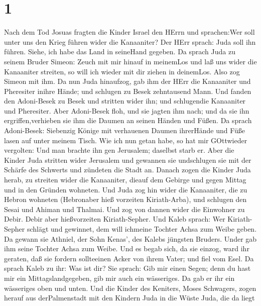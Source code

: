 \hypertarget{section}{%
\section{1}\label{section}}

 Nach dem Tod Josuas fragten die Kinder Israel den HErrn und
sprachen:Wer soll unter uns den Krieg führen wider die Kanaaniter?
 Der HErr sprach: Juda soll ihn führen. Siehe, ich habe das
Land in seineHand gegeben.  Da sprach Juda zu seinem Bruder
Simeon: Zeuch mit mir hinauf in meinemLos und laß uns wider die
Kanaaniter streiten, so will ich wieder mit dir ziehen in deinemLos.
Also zog Simeon mit ihm.  Da nun Juda hinaufzog, gab ihm der
HErr die Kanaaniter und Pheresiter inihre Hände; und schlugen zu Besek
zehntausend Mann.  Und fanden den Adoni-Besek zu Besek und
stritten wider ihn; und schlugendie Kanaaniter und Pheresiter.
 Aber Adoni-Besek floh, und sie jagten ihm nach; und da sie
ihn ergriffen,verhieben sie ihm die Daumen an seinen Händen und Füßen.
 Da sprach Adoni-Besek: Siebenzig Könige mit verhauenen
Daumen ihrerHände und Füße lasen auf unter meinem Tisch. Wie ich nun
getan habe, so hat mir GOttwieder vergolten: Und man brachte ihn gen
Jerusalem; daselbst starb er.  Aber die Kinder Juda stritten
wider Jerusalem und gewannen sie undschlugen sie mit der Schärfe des
Schwerts und zündeten die Stadt an.  Danach zogen die Kinder
Juda herab, zu streiten wider die Kanaaniter, dieauf dem Gebirge und
gegen Mittag und in den Gründen wohneten.  Und Juda zog hin
wider die Kanaaniter, die zu Hebron wohneten (Hebronaber hieß vorzeiten
Kiriath-Arba), und schlugen den Sesai und Ahiman und Thalmai.
 Und zog von dannen wider die Einwohner zu Debir. Debir
aber hießvorzeiten Kiriath-Sepher.  Und Kaleb sprach: Wer
Kiriath-Sepher schlägt und gewinnet, dem will ichmeine Tochter Achsa zum
Weibe geben.  Da gewann sie Athniel, der Sohn Kenas', des
Kalebs jüngsten Bruders. Under gab ihm seine Tochter Achsa zum Weibe.
 Und es begab sich, da sie einzog, ward ihr geraten, daß
sie fordern sollteeinen Acker von ihrem Vater; und fiel vom Esel. Da
sprach Kaleb zu ihr: Was ist dir?  Sie sprach: Gib mir
einen Segen; denn du hast mir ein Mittagslandgegeben, gib mir auch ein
wässeriges. Da gab er ihr ein wässeriges oben und unten. 
Und die Kinder des Keniters, Moses Schwagers, zogen herauf aus
derPalmenstadt mit den Kindern Juda in die Wüste Juda, die da liegt
